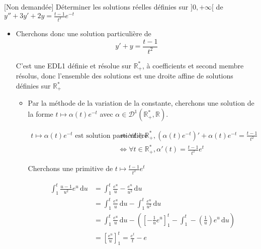 \documentclass{article}
\begin{document}
\begin{question_kholle}[]{[Non demandée] Déterminer les solutions réelles définies sur $]0, + \infty [$ de $y'' + 3y' +2y = \frac{t-1}{t^{2}}e^{ -t }$}
\begin{itemize}[label=$\star$]
          \begin{itemize}[label=$\lozenge$]
            \item Cherchons donc une solution particulière de
                  $$
                    y' + y = \frac{t-1}{t^{2}}
                  $$

                  C'est une EDL1 définie et résolue sur $\mathbb{R}_{+}^{*}$, à coefficients et second membre résolus, donc l'ensemble des solutions est une droite affine de solutions définies sur $\mathbb{R}_{+}^{*}$

                  \begin{itemize}[label=$\triangle$]
                    \item Par la méthode de la variation de la constante, cherchons une solution de la forme $t \mapsto \alpha (t) e^{ -t }$ avec $\alpha \in \mathcal{D}^{1}(\mathbb{R}_{+}^{*}, \mathbb{R})$.


                          \begin{align*}
                            t \mapsto \alpha(t)e^{ -t } \text{ est solution particulière } & \iff \forall t \in \mathbb{R}_{+}^{*}, (\alpha(t)e^{ -t })' + \alpha(t)e^{ -t }= \frac{t-1}{t^{2}} \\
                                                                                           & \iff \forall t \in \mathbb{R}_{+}^{*}, \alpha'(t) = \frac{t-1}{t^{2}}e^{ t }
                          \end{align*}


                          Cherchons une primitive de $t \mapsto \frac{t-1}{t^{2}}e^{ t }$


                          \begin{align*}
                            \int_{1}^{t} \frac{u-1}{u^{2}}e^{ u } \, \mathrm du & = \int_{1}^{t} \frac{e^{ u }}{u} - \frac{e^{ u }}{u^{2}} \, \mathrm du                                                                                                         \\
                                                                                & = \int_{1}^{t} \frac{e^{ u }}{u} \, \mathrm du - \int_{1}^{t} \frac{e^{ u }}{u^{2}} \, \mathrm du                                                                              \\
                                                                                & = \int_{1}^{t} \frac{e^{ u }}{u} \, \mathrm du  - \left( \left[ -\frac{1}{u}e^{ u } \right] _{1}^{t} - \int_{1}^{t} -\left( \frac{1}{u} \right) e^{ u } \, \mathrm du  \right) \\
                                                                                & = \left[ \frac{e^{ u }}{u} \right] _{1}^{t} = \frac{e^{t}}{t} - e
                          \end{align*}



\end{itemize}
\end{itemize}
\end{itemize}
\end{question_kholle}
\end{document}

